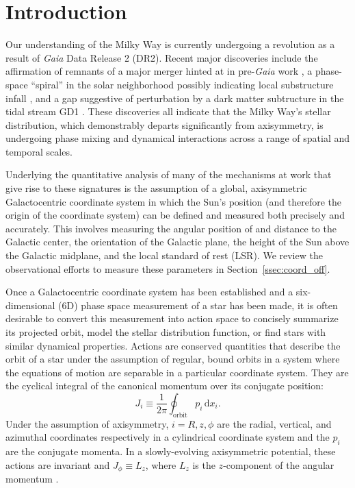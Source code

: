 \documentclass[twocolumn]{aastex62}
\newcommand{\beq}{\begin{equation}}
\newcommand{\eeq}{\end{equation}}
\begin{document}

\section{Introduction} \label{sec:intro}
Our understanding of the Milky Way is currently undergoing a revolution as a
result of \textit{Gaia} Data Release 2 (DR2).  Recent major discoveries
include the affirmation of remnants of a major merger \citep{2018ApJ...860L..11K, 2018MNRAS.478..611B, 2018Natur.563...85H, 2019MNRAS.486..378L, 2019MNRAS.482.3426M} hinted at in pre-\textit{Gaia} work \citep[e.g.][]{2005MNRAS.359...93M, 2011MNRAS.412.1203N}, a phase-space
``spiral'' in the solar neighborhood \citep{2018Natur.561..360A} possibly
indicating local substructure infall \citep{2018MNRAS.481.1501B,
2018arXiv180800451L}, and a gap
suggestive of perturbation by a dark matter subtructure in the tidal stream
GD1 \citep{2018ApJ...863L..20P, 2018arXiv181103631B}. These discoveries all
indicate that the Milky Way's stellar distribution, which demonstrably departs
significantly from axisymmetry, is undergoing phase mixing and dynamical
interactions across a range of spatial and temporal scales.

Underlying the quantitative analysis of many of the mechanisms at work that
give rise to these signatures is the assumption of a global, axisymmetric
Galactocentric coordinate system \citep{2008gady.book.....B} in which the
Sun's position (and therefore the origin of the coordinate system) can be
defined and measured both precisely and accurately. This involves measuring
the angular position of and distance to the Galactic center, the orientation
of the Galactic plane, the height of the Sun above the Galactic midplane, and
the local standard of rest (LSR). We review the observational efforts to
measure these parameters in Section~\ref{ssec:coord_off}.

Once a Galactocentric coordinate system has been established and a
six-dimensional (6D) phase space measurement of a star has been made, it is
often desirable to convert this measurement into action space to concisely
summarize its projected orbit, model the stellar distribution function, or
find stars with similar dynamical properties. Actions are conserved quantities
that describe the orbit of a star under the assumption of regular, bound
orbits in a system where the equations of motion are separable in a particular
coordinate system. They are the cyclical integral of the canonical momentum
over its conjugate position:
\beq\label{eq:actions}
J_i \equiv
\frac{1}{2\pi} \oint_{\text{orbit}}p_i\,\text{d}x_i\text{.}
\eeq
Under the assumption of axisymmetry, $i=R,z,\phi$ are the radial, vertical,
and azimuthal coordinates respectively in a cylindrical coordinate system and
the $p_i$ are the conjugate momenta. In a slowly-evolving axisymmetric
potential, these actions are invariant and $J_{\phi} \equiv L_z$, where $L_z$
is the $z$-component of the angular momentum
\citep{2008gady.book.....B,2014RvMP...86....1S}.
\end{document}
